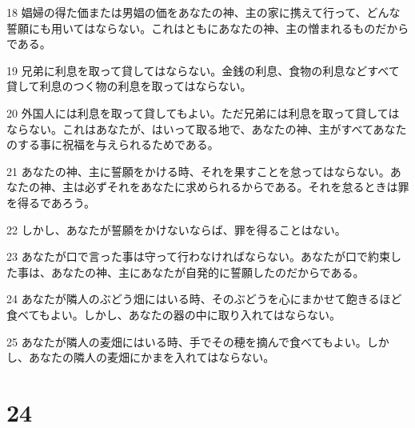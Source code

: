 \par 18 娼婦の得た価または男娼の価をあなたの神、主の家に携えて行って、どんな誓願にも用いてはならない。これはともにあなたの神、主の憎まれるものだからである。
\par 19 兄弟に利息を取って貸してはならない。金銭の利息、食物の利息などすべて貸して利息のつく物の利息を取ってはならない。
\par 20 外国人には利息を取って貸してもよい。ただ兄弟には利息を取って貸してはならない。これはあなたが、はいって取る地で、あなたの神、主がすべてあなたのする事に祝福を与えられるためである。
\par 21 あなたの神、主に誓願をかける時、それを果すことを怠ってはならない。あなたの神、主は必ずそれをあなたに求められるからである。それを怠るときは罪を得るであろう。
\par 22 しかし、あなたが誓願をかけないならば、罪を得ることはない。
\par 23 あなたが口で言った事は守って行わなければならない。あなたが口で約束した事は、あなたの神、主にあなたが自発的に誓願したのだからである。
\par 24 あなたが隣人のぶどう畑にはいる時、そのぶどうを心にまかせて飽きるほど食べてもよい。しかし、あなたの器の中に取り入れてはならない。
\par 25 あなたが隣人の麦畑にはいる時、手でその穂を摘んで食べてもよい。しかし、あなたの隣人の麦畑にかまを入れてはならない。

\chapter{24}

